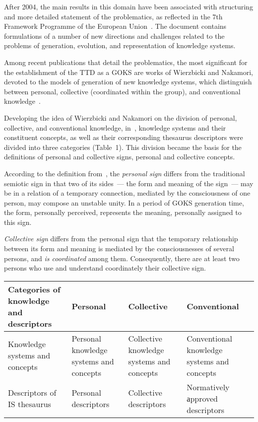 \begin{multicols}{2}
   After 2004, the main results in this domain have been associated with structuring and more 
detailed statement of the problematics, as reflected in the 7th Framework Programme of the 
European Union~\cite{10bun}. The document contains formulations of a number of new 
directions and challenges related to the problems of generation, evolution, and representation of 
knowledge systems.
   
   Among recent publications that detail the problematics, the most significant for the 
establishment of the TTD as a GOKS are works of Wierzbicki and Nakamori, devoted to the models 
of generation of new knowledge systems, which distinguish between personal, collective 
(coordinated within the group), and conventional knowledge~\cite{11bun, 12bun}.
   
   Developing the idea of Wierzbicki and Nakamori on the division of personal, collective, and 
conventional knowledge, in~\cite{3bun, 1bun}, knowledge systems and their constituent 
concepts, as well as their corresponding \mbox{thesaurus} descriptors were divided into three categories 
(Table~1). This division became the basis for the definitions of personal and collective signs, 
personal and collective concepts.
   
   According to the definition from~\cite{13bun, 14bun}, the \textit{personal sign} differs from 
the traditional semiotic sign in that two of its sides~--- the form and meaning of the 
   sign~--- may be in a relation of a temporary connection, mediated by the consciousness of 
one person, may compose an unstable unity. In a period of GOKS generation 
time, the form, personally perceived, represents the meaning, personally
assigned to this sign.
   
   \textit{Collective sign} differs from the personal sign that the temporary relationship between 
its form and meaning is mediated by the consciousnesses of several persons, and \textit{is 
coordinated} among them. Consequently, there are at least two persons who use and understand 
coordinately their collective sign.
   
\begin{table*}\small
\begin{center}
\vspace*{2ex}
   
   \begin{tabular}{p{35mm}p{35mm}p{35mm}p{35mm}}
   \hline
Categories of knowledge and descriptors   &Personal&Collective&Conventional\\
\hline
Knowledge systems and concepts&Personal knowledge systems and concepts&Collective 
knowledge systems and concepts&Conventional knowledge systems and concepts\\
\hline
Descriptors of IS thesaurus&Personal descriptors&Collective descriptors&Normatively 
аpproved descriptors\\
\hline
\end{tabular}
\end{center}
\end{table*}
   

\end{multicols}
